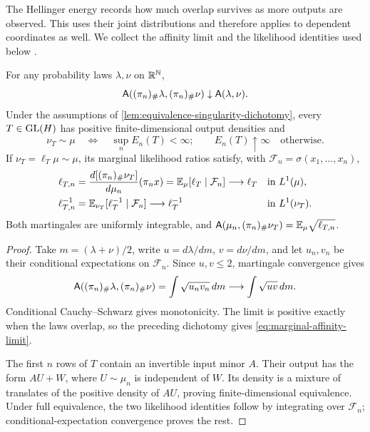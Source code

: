 The Hellinger energy records how much overlap survives as more outputs are
observed. This uses their joint distributions and therefore applies to
dependent coordinates as well. We collect the affinity limit and the
likelihood identities used below \cite{lecam1986asymptotic,mandrekar2018lebesgue}.

\begin{lemma}
\label{lem:finite-marginal-likelihood-ratios}
For any probability laws \(\lambda,\nu\) on \(\mathbb R^{\mathbb N}\),
\begin{equation}
 \mathsf A((\pi_n)_\#\lambda,(\pi_n)_\#\nu)
       \downarrow\mathsf A(\lambda,\nu).
 \label{eq:general-marginal-affinity-limit}
\end{equation}
Under the assumptions of \cref{lem:equivalence-singularity-dichotomy},
every \(T\in\operatorname{GL}(H)\) has positive finite-dimensional output densities and
\begin{equation}
 \nu_T\sim\mu\quad\Longleftrightarrow\quad\sup_nE_n(T)<\infty;
 \qquad E_n(T)\uparrow\infty\quad\text{otherwise}.
 \label{eq:marginal-affinity-limit}
\end{equation}
If \(\nu_T=\ell_T\mu\sim\mu\), its marginal likelihood ratios satisfy,
with \(\mathcal F_n=\sigma(x_1,\ldots,x_n)\),
\begin{equation}
 \begin{aligned}
 \ell_{T,n}
 &=\frac{d[(\pi_n)_\#\nu_T]}{d\mu_n}(\pi_n x)
   =\mathbb E_\mu[\ell_T\mid\mathcal F_n]
       \longrightarrow\ell_T &&\text{in }L^1(\mu),\\
 \ell_{T,n}^{-1}
 &=\mathbb E_{\nu_T}[\ell_T^{-1}\mid\mathcal F_n]
       \longrightarrow\ell_T^{-1} &&\text{in }L^1(\nu_T).
 \end{aligned}
\end{equation}
Both martingales are uniformly integrable, and
\(\mathsf A(\mu_n,(\pi_n)_\#\nu_T)=\mathbb E_\mu\sqrt{\ell_{T,n}}\).
\end{lemma}
\begin{proof}
Take \(m=(\lambda+\nu)/2\), write \(u=d\lambda/dm\), \(v=d\nu/dm\),
and let \(u_n,v_n\) be their conditional expectations on \(\mathcal F_n\).
Since \(u,v\le2\), martingale convergence gives
\[
 \mathsf A((\pi_n)_\#\lambda,(\pi_n)_\#\nu)
 =\int\sqrt{u_nv_n}\,dm\longrightarrow\int\sqrt{uv}\,dm.
\]
Conditional Cauchy--Schwarz gives monotonicity. The limit is positive
exactly when the laws overlap, so the preceding dichotomy gives
\eqref{eq:marginal-affinity-limit}.

The first \(n\) rows of \(T\) contain an invertible input minor \(A\).
Their output has the form \(AU+W\), where \(U\sim\mu_n\) is independent
of \(W\). Its density is a mixture of translates of the positive density
of \(AU\), proving finite-dimensional equivalence. Under full equivalence,
the two likelihood identities follow by integrating over
\(\mathcal F_n\); conditional-expectation convergence proves the rest.
\end{proof}

